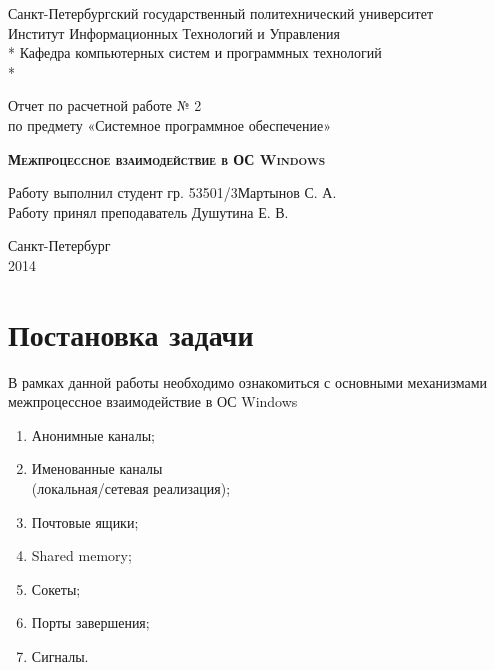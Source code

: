 \documentclass[a4paper,12pt]{article} %
\begin{document}
\begin{titlepage}
\newpage

\begin{center}
Санкт-Петербургский государственный политехнический университет \\
Институт Информационных Технологий и Управления \\*
Кафедра компьютерных систем и программных технологий \\*
\hrulefill
\end{center}

\vspace{18em}

\begin{center}
\Large Отчет по расчетной работе № 2 \\ по предмету «Системное программное обеспечение» \\
\end{center}

\vspace{1em}

\begin{center}
\textsc{\textbf{Межпроцессное взаимодействие в ОС Windows}}
\end{center}

\vspace{16em}

\begin{flushleft}
Работу выполнил студент гр. 53501/3\hrulefill Мартынов С. А. \\
\vspace{1.5em}
Работу принял преподаватель \hrulefill Душутина Е. В. \\
\end{flushleft}

\vspace{\fill}

\begin{center}
Санкт-Петербург \\
2014
\end{center}

\end{titlepage}
\newpage

\section*{Постановка задачи}

В рамках данной работы необходимо ознакомиться с основными механизмами межпроцессное взаимодействие в ОС Windows
\begin{enumerate}
    \item Анонимные каналы;
    \item Именованные каналы \\
        (локальная/сетевая реализация);
    \item Почтовые ящики;
    \item Shared memory;
    \item Сокеты;
    \item Порты завершения;
    \item Сигналы.
\end{enumerate}
\end{document}
